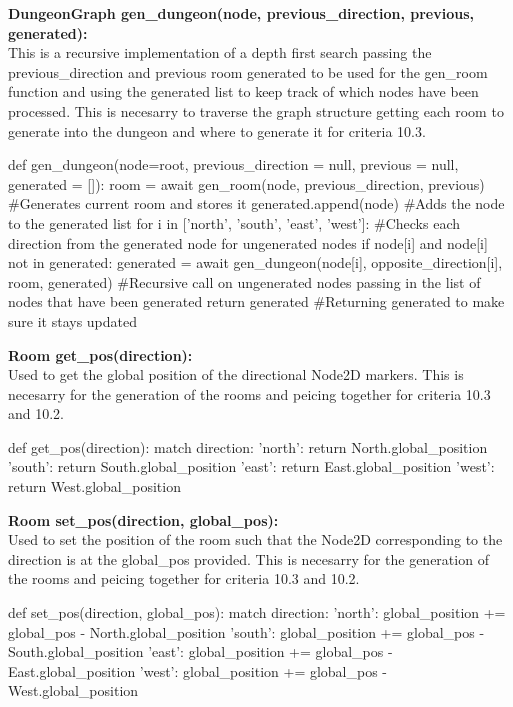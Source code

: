 \documentclass{article}
\begin{document}
        \textbf{DungeonGraph gen\_dungeon(node, previous\_direction, previous, generated):}\\
        This is a recursive implementation of a depth first search passing the previous\_direction and previous room generated to be used for the gen\_room function and using the generated list to keep track of which nodes have been processed. This is necesarry to traverse the graph structure getting each room to generate into the dungeon and where to generate it for criteria 10.3.\\
        \begin{python}
def gen_dungeon(node=root, previous_direction = null, previous = null, generated = []):
   room = await gen_room(node, previous_direction, previous) #Generates current room and stores it
   generated.append(node) #Adds the node to the generated list
   for i in ['north', 'south', 'east', 'west']: #Checks each direction from the generated node for ungenerated nodes
      if node[i] and node[i] not in generated:
         generated = await gen_dungeon(node[i], opposite_direction[i], room, generated) #Recursive call on ungenerated nodes passing in the list of nodes that have been generated
   return generated #Returning generated to make sure it stays updated
        \end{python}
        \textbf{Room get\_pos(direction):}\\
        Used to get the global position of the directional Node2D markers. This is necesarry for the generation of the rooms and peicing together for criteria 10.3 and 10.2.\\
        \begin{python}
def get_pos(direction):
   match direction:
      'north':
         return North.global_position
      'south':
         return South.global_position 
      'east':
         return East.global_position 
      'west':
         return West.global_position
        \end{python}
        \textbf{Room set\_pos(direction, global\_pos):}\\
        Used to set the position of the room such that the Node2D corresponding to the direction is at the global\_pos provided. This is necesarry for the generation of the rooms and peicing together for criteria 10.3 and 10.2.\\
        \begin{python}
def set_pos(direction, global_pos):
   match direction:
      'north':
         global_position += global_pos - North.global_position
      'south':
	 global_position += global_pos - South.global_position 
      'east':
	 global_position += global_pos - East.global_position 
      'west':
	 global_position += global_pos - West.global_position 
        \end{python}\
\end{document}
